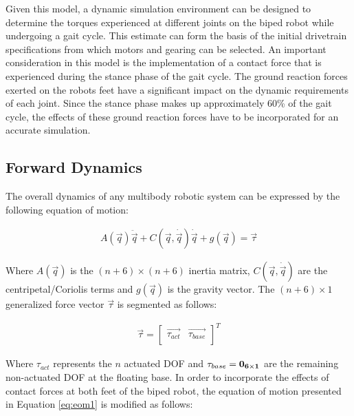 Given this model, a dynamic simulation environment can be designed to determine the torques experienced at different joints on the biped robot while undergoing a gait cycle. This estimate can form the basis of the initial drivetrain specifications from which motors and gearing can be selected. An important consideration in this model is the implementation of a contact force that is experienced during the stance phase of the gait cycle. The ground reaction forces exerted on the robots feet have a significant impact on the dynamic requirements of each joint. Since the stance phase makes up approximately 60\% of the gait cycle, the effects of these ground reaction forces have to be incorporated for an accurate simulation. 

\subsection{Forward Dynamics} %
\label{sec:forward_dynamics}

The overall dynamics of any multibody robotic system can be expressed by the following equation of motion:

\begin{eqnarray}
	\label{eq:eom1}
	A(\vec{q})\ddot{\vec{q}} + C(\vec{q},\dot{\vec{q}})\dot{\vec{q}} + g(\vec{q}) = \vec{\tau}
\end{eqnarray}

Where $A(\vec{q})$ is the $(n+6) \times (n+6)$ inertia matrix, $C(\vec{q},\dot{\vec{q}})$ are the centripetal/Coriolis terms and $g(\vec{q})$ is the gravity vector. The $(n+6) \times 1$ generalized force vector $\vec{\tau}$ is segmented as follows:

\begin{eqnarray}
	\label{eq:gentau}
	\vec{\tau} = {\begin{bmatrix} \vec{\tau_{act}} & \vec{\tau_{base}} \\ \end{bmatrix}}^T
\end{eqnarray}

Where $\tau_{act}$ represents the $n$ actuated DOF and $\tau_{base} = \bf{0}_{6 \times 1} $ are the remaining non-actuated DOF at the floating base. In order to incorporate the effects of contact forces at both feet of the biped robot, the equation of motion presented in Equation \ref{eq:eom1} is modified as follows: 


